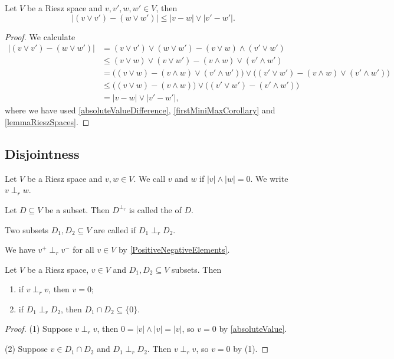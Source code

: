 \begin{proposition}
Let $V$ be a Riesz space and $v,v',w,w'\in V$, then
\[ |(v\vee v')- (w\vee w')| \leq |v-w| \vee |v'- w'|. \]
\end{proposition}
\begin{proof}
We calculate
\begin{align*}
|(v\vee v')- (w\vee w')| &= (v\vee v')\vee(w\vee w') - (v\vee w)\wedge (v'\vee w') \\
&\leq (v\vee w)\vee(v\vee w') - (v\wedge w)\vee (v'\wedge w') \\
&= \big((v\vee w) - (v\wedge w)\vee (v'\wedge w')\big)\vee\big((v'\vee w') - (v\wedge w)\vee (v'\wedge w')\big) \\
&\leq \big((v\vee w) - (v\wedge w)\big)\vee\big((v'\vee w') - (v'\wedge w')\big) \\
&= |v-w|\vee |v'-w'|,
\end{align*}
where we have used \ref{absoluteValueDifference}, \ref{firstMiniMaxCorollary} and \ref{lemmaRieszSpaces}.
\end{proof}

\subsection{Disjointness}
\begin{definition}
Let $V$ be a Riesz space and $v,w\in V$. We call $v$ and $w$  if $|v|\wedge |w| = 0$. We write $v\perp_r w$.

Let $D\subseteq V$ be a subset. Then $D^{\perp_r}$ is called the  of $D$.

Two subsets $D_1,D_2\subseteq V$ are called  if $D_1 \perp_r D_2$.
\end{definition}
We have $v^+\perp_r v^-$ for all $v\in V$ by \ref{PositiveNegativeElements}.

\begin{lemma} \label{vectorDisjointWithItself}
Let $V$ be a Riesz space, $v\in V$ and $D_1, D_2 \subseteq V$ subsets. Then
\begin{enumerate}
\item if $v\perp_r v$, then $v = 0$;
\item if $D_1\perp_r D_2$, then $D_1\cap D_2 \subseteq \{0\}$.
\end{enumerate}
\end{lemma}
\begin{proof}
(1) Suppose $v\perp_r v$, then $0 = |v|\wedge |v| = |v|$, so $v = 0$ by \ref{absoluteValue}.

(2) Suppose $v\in D_1\cap D_2$ and $D_1\perp_r D_2$. Then $v\perp_r v$, so $v=0$ by (1).
\end{proof}

